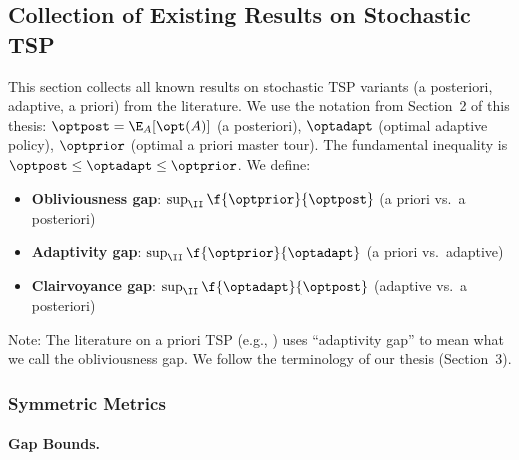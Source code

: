 \subsection{Collection of Existing Results on Stochastic TSP}\label{sec:results-collection}

This section collects all known results on stochastic TSP variants (a posteriori, adaptive, a priori) from the literature.
We use the notation from Section~2 of this thesis:
$\optpost = \E_A[\opt(A)]$ (a posteriori),
$\optadapt$ (optimal adaptive policy),
$\optprior$ (optimal a priori master tour).
The fundamental inequality is $\optpost \le \optadapt \le \optprior$.
We define:
\begin{itemize}
    \item \textbf{Obliviousness gap}: $\sup_{\II} \f{\optprior}{\optpost}$ \quad (a priori vs.\ a posteriori)
    \item \textbf{Adaptivity gap}: $\sup_{\II} \f{\optprior}{\optadapt}$ \quad (a priori vs.\ adaptive)
    \item \textbf{Clairvoyance gap}: $\sup_{\II} \f{\optadapt}{\optpost}$ \quad (adaptive vs.\ a posteriori)
\end{itemize}
Note: The literature on a priori TSP (e.g., \cite{Christalla2025}) uses ``adaptivity gap'' to mean what we call the obliviousness gap. We follow the terminology of our thesis (Section~3).

\subsubsection{Symmetric Metrics}

\paragraph{Gap Bounds.}

\begin{center}
\renewcommand{\arraystretch}{1.4}
\end{center}

